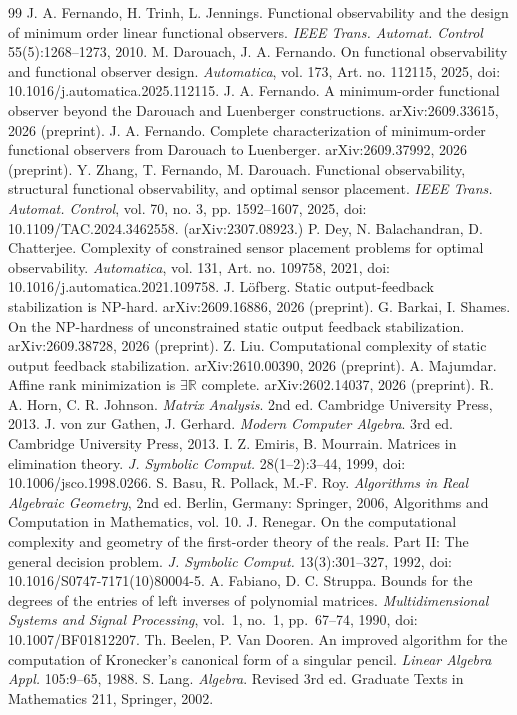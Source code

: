 \documentclass[journal]{IEEEtran}
\theoremstyle{plainn}
\theoremstyle{remark}
\begin{document}
\begin{thebibliography}{99}
 J. A. Fernando, H. Trinh, L. Jennings. Functional observability and the design of minimum order linear functional observers. \emph{IEEE Trans. Automat. Control} 55(5):1268--1273, 2010.
 M. Darouach, J. A. Fernando. On functional observability and functional observer design. \emph{Automatica}, vol. 173, Art. no. 112115, 2025, doi: 10.1016/j.automatica.2025.112115.
 J. A. Fernando. A minimum-order functional observer beyond the Darouach and Luenberger constructions. arXiv:2609.33615, 2026 (preprint).
 J. A. Fernando. Complete characterization of minimum-order functional observers from Darouach to Luenberger. arXiv:2609.37992, 2026 (preprint).
 Y. Zhang, T. Fernando, M. Darouach. Functional
  observability, structural functional observability, and optimal sensor
  placement. \emph{IEEE Trans. Automat. Control}, vol. 70, no. 3,
  pp. 1592--1607, 2025, doi: 10.1109/TAC.2024.3462558.
  (arXiv:2307.08923.)
 P. Dey, N. Balachandran, D. Chatterjee. Complexity of
  constrained sensor placement problems for optimal observability.
  \emph{Automatica}, vol. 131, Art. no. 109758, 2021,
  doi: 10.1016/j.automatica.2021.109758.
 J. L\"{o}fberg. Static output-feedback stabilization is
  NP-hard. arXiv:2609.16886, 2026 (preprint).
 G. Barkai, I. Shames. On the NP-hardness of unconstrained
  static output feedback stabilization. arXiv:2609.38728, 2026 (preprint).
 Z. Liu. Computational complexity of static output feedback
  stabilization. arXiv:2610.00390, 2026 (preprint).
 A. Majumdar. Affine rank minimization is
  $\exists\mathbb{R}$ complete. arXiv:2602.14037, 2026 (preprint).
 R. A. Horn, C. R. Johnson. \emph{Matrix Analysis}. 2nd ed.
Cambridge University Press, 2013.
 J. von zur Gathen, J. Gerhard. \emph{Modern Computer Algebra}.
3rd ed. Cambridge University Press, 2013.
 I. Z. Emiris, B. Mourrain. Matrices in elimination theory. \emph{J. Symbolic Comput.} 28(1--2):3--44, 1999, doi: 10.1006/jsco.1998.0266.
 S. Basu, R. Pollack, M.-F. Roy. \emph{Algorithms in Real
  Algebraic Geometry}, 2nd ed. Berlin, Germany: Springer, 2006,
  Algorithms and Computation in Mathematics, vol. 10.
 J. Renegar. On the computational complexity and geometry of the first-order theory of the reals. Part II: The general decision problem. \emph{J. Symbolic Comput.} 13(3):301--327, 1992, doi: 10.1016/S0747-7171(10)80004-5.
 A. Fabiano, D. C. Struppa. Bounds for the degrees of the entries of left
inverses of polynomial matrices. \emph{Multidimensional Systems and Signal Processing},
vol.~1, no.~1, pp.~67--74, 1990, doi: 10.1007/BF01812207.
 Th. Beelen, P. Van Dooren. An improved algorithm for the computation of Kronecker's canonical form of a singular pencil. \emph{Linear Algebra Appl.} 105:9--65, 1988.
 S. Lang. \emph{Algebra}. Revised 3rd ed.
Graduate Texts in Mathematics 211, Springer, 2002.
\end{thebibliography}
\end{document}
